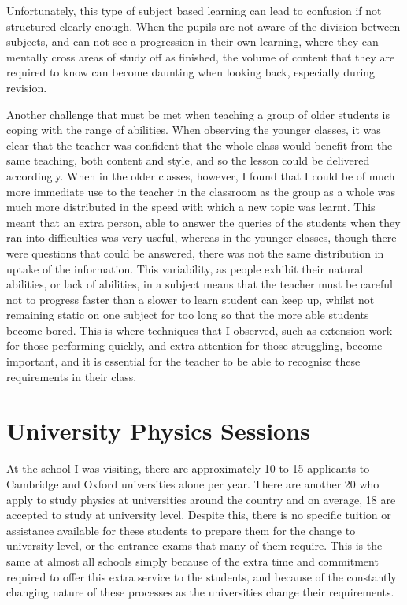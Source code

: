 		Unfortunately, this type of subject based learning can lead to confusion if not structured clearly enough. When the pupils are not aware of the division between subjects, and can not see a progression in their own learning, where they can mentally cross areas of study off as finished, the volume of content that they are required to know can become daunting when looking back, especially during revision.

		Another challenge that must be met when teaching a group of older students is coping with the range of abilities. When observing the younger classes, it was clear that the teacher was confident that the whole class would benefit from the same teaching, both content and style, and so the lesson could be delivered accordingly. When in the older classes, however, I found that I could be of much more immediate use to the teacher in the classroom as the group as a whole was much more distributed in the speed with which a new topic was learnt. This meant that an extra person, able to answer the queries of the students when they ran into difficulties was very useful, whereas in the younger classes, though there were questions that could be answered, there was not the same distribution in uptake of the information. This variability, as people exhibit their natural abilities, or lack of abilities, in a subject means that the teacher must be careful not to progress faster than a slower to learn student can keep up, whilst not remaining static on one subject for too long so that the more able students become bored. This is where techniques that I observed, such as extension work for those performing quickly, and extra attention for those struggling, become important, and it is essential for the teacher to be able to recognise these requirements in their class.

\section{University Physics Sessions} %
\label{sec:university_physics_sessions}
    At the school I was visiting, there are approximately 10 to 15 applicants to Cambridge and Oxford universities alone per year. There are another 20 who apply to study physics at universities around the country and on average, 18 are accepted to study at university level. Despite this, there is no specific tuition or assistance available for these students to prepare them for the change to university level, or the entrance exams that many of them require. This is the same at almost all schools simply because of the extra time and commitment required to offer this extra service to the students, and because of the constantly changing nature of these processes as the universities change their requirements.

